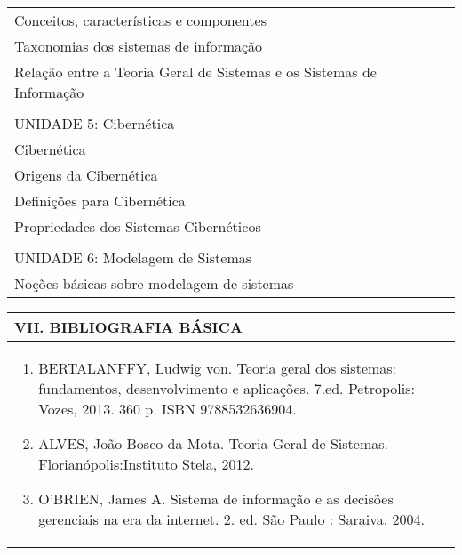 \documentclass[12pt]{article}
\begin{document}
\begin{longtable}{|L{1.025\textwidth}|}
 Conceitos, características e componentes\\
 Taxonomias dos sistemas de informação\\
 Relação entre a Teoria Geral de Sistemas e os Sistemas de Informação\\
\\
UNIDADE 5: Cibernética\\
 Cibernética\\
 Origens da Cibernética\\
 Definições para Cibernética\\
 Propriedades dos Sistemas Cibernéticos\\
\\
UNIDADE 6: Modelagem de Sistemas\\
 Noções básicas sobre modelagem de sistemas



\\ \hline
\end{longtable} 


\begin{longtable}{|L{1.025\textwidth}|} \hline
%
{\bf VII. BIBLIOGRAFIA BÁSICA} \\ \hline
\begin{enumerate}
%
\item BERTALANFFY, Ludwig von. Teoria geral dos sistemas: fundamentos, desenvolvimento e aplicações. 7.ed. Petropolis: Vozes, 2013. 360 p. ISBN 9788532636904.
\item ALVES, João Bosco da Mota. Teoria Geral de Sistemas. Florianópolis:Instituto Stela, 2012. 
\item O'BRIEN, James A. Sistema de informação e as decisões gerenciais na era da internet. 2. ed. São Paulo : Saraiva, 2004.
\end{enumerate}
 \\ \hline
\end{longtable}


\end{document}
